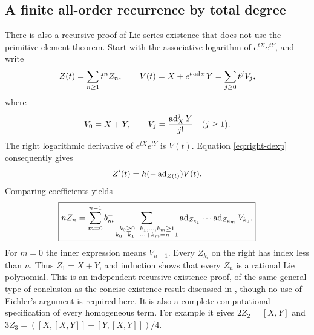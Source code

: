 \subsection{A finite all-order recurrence by total degree}\label{sec:homogeneous-recursion}
There is also a recursive proof of Lie-series existence that does not use the primitive-element theorem. Start with the associative logarithm of $e^{tX}e^{tY}$, and write
\[
 Z(t)=\sum_{n\geq1}t^n Z_n,
 \qquad V(t)=X+e^{t\operatorname{ad}_X}Y=\sum_{j\geq0}t^jV_j,
\]
where
\begin{equation}\label{eq:Vj}
 V_0=X+Y,\qquad V_j=\frac{\operatorname{ad}_X^jY}{j!}\quad(j\geq1).
\end{equation}
The right logarithmic derivative of $e^{tX}e^{tY}$ is $V(t)$. Equation \cref{eq:right-dexp} consequently gives
\[
 Z'(t)=h(-\operatorname{ad}_{Z(t)})V(t).
\]
Comparing coefficients yields
\begin{equation}\label{eq:total-recursion}
 \boxed{\displaystyle
 nZ_n=\sum_{m=0}^{n-1}b_m^-
 \sum_{\substack{k_0\geq0,\ k_1,\ldots,k_m\geq1\\
                   k_0+k_1+\cdots+k_m=n-1}}
 \operatorname{ad}_{Z_{k_1}}\cdots\operatorname{ad}_{Z_{k_m}}V_{k_0}.}
\end{equation}
For $m=0$ the inner expression means $V_{n-1}$. Every $Z_{k_i}$ on the right has index less than $n$. Thus $Z_1=X+Y$, and induction shows that every $Z_n$ is a rational Lie polynomial. This is an independent recursive existence proof, of the same general type of conclusion as the concise existence result discussed in \cite{Eichler}, though no use of Eichler's argument is required here. It is also a complete computational specification of every homogeneous term. For example it gives $2Z_2=[X,Y]$ and
$3Z_3=([X,[X,Y]]-[Y,[X,Y]])/4$.
